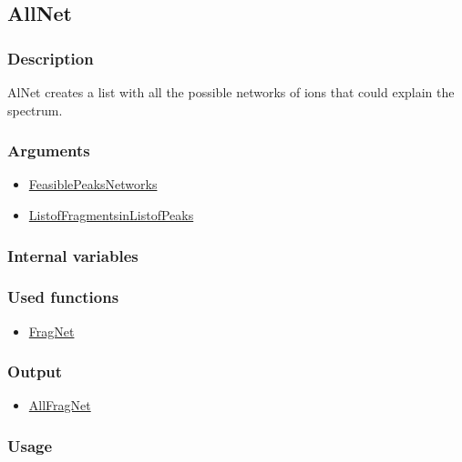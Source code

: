 \subsection{AllNet}\label{AllNet}
\subsubsection{Description}
AlNet creates a list with all the possible networks of ions that could explain the spectrum.
\subsubsection{Arguments}
\begin{itemize}
\item \hyperref[FeasiblePeaksNetworks]{FeasiblePeaksNetworks}
\item \hyperref[ListofFragmentsinListofPeaks]{ListofFragmentsinListofPeaks}
\end{itemize}
\subsubsection{Internal variables}
\subsubsection{Used functions}
\begin{itemize}
\item \hyperref[FragNet]{FragNet}
\end{itemize}
\subsubsection{Output}
\begin{itemize}
\item \hyperref[AllFragNet]{AllFragNet}
\end{itemize}
\subsubsection{Usage}




